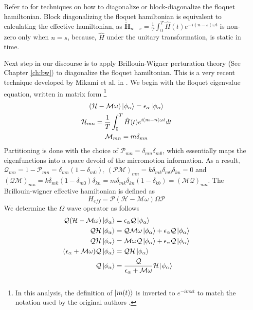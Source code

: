 Refer to \parencite{anisimovas2015high} for techniques on how to diagonalize or block-diagonalize the floquet hamiltonian. Block diagonalizing the floquet hamiltonian is
equivalent to calculating the effective hamiltonian, as $\tilde{\mathbf{H}}_{n-s} = \frac{1}{T}\int_{0}^{T}{\hat{H}(t) e^{-i(n-s)\omega t}}$ is non-zero only when
$n=s$, because, $\hat{H}$ under the unitary transformation, is static in time.

Next step in our discourse is to apply Brillouin-Wigner perturation theory (See Chapter \ref{ch:bw}) to diagonalize the floquet hamiltonian. This is a very recent technique developed by Mikami et al. in 
\parencite{mikami2016brillouin}. We begin with the floquet eigenvalue equation, written in matrix form \footnote{In this analysis, the definition of $\ket{m(t)}$ is 
inverted to $e^{-im\omega t}$ to match the notation used by the original authors \cite{mikami2016brillouin}.}
\begin{gather}
(\mathcal{H} - \mathcal{M}\omega)\ket{\phi_\alpha} = \epsilon_\alpha\ket{\phi_\alpha} \\
\mathcal{H}_{mn} = \frac{1}{T}\int_{0}^{T}{\hat{H}(t)e^{i(m-n)\omega t}dt} \\
\mathcal{M}_{mn} = m\delta_{mn}
\end{gather}
Partitioning is done with the choice of $\mathcal{P}_{mn} = \delta_{mn}\delta_{m0}$, which essentially maps the eigenfunctions into a space devoid of the micromotion information.
As a result, $\mathcal{Q}_{mn} = 1 - \mathcal{P}_{mn} = \delta_{mn}(1-\delta_{m0})$, $(\mathcal{P}\mathcal{M})_{mn} = k\delta_{mk}\delta_{m0}\delta_{kn}=0$ and
$(\mathcal{Q}\mathcal{M})_{mn} = k\delta_{mk}(1-\delta_{m0})\delta_{kn} = m\delta_{mk}\delta_{kn}(1-\delta_{k0}) = (\mathcal{M}\mathcal{Q})_{mn}$.
The Brillouin-wigner effective hamiltonian is defined as
\begin{equation}
 H_{eff} = \mathcal{P}(\mathcal{H} - \mathcal{M}\omega)\Omega\mathcal{P}
\end{equation} We determine the $\Omega$ wave operator as follows
\begin{align}
 \mathcal{Q}(\mathcal{H} - \mathcal{M}\omega)\ket{\phi_\alpha} &= \epsilon_\alpha\mathcal{Q}\ket{\phi_\alpha} \nonumber \\
 \mathcal{Q}\mathcal{H}\ket{\phi_\alpha} &= \mathcal{Q}\mathcal{M}\omega\ket{\phi_\alpha} + \epsilon_\alpha\mathcal{Q}\ket{\phi_\alpha} \nonumber \\
 \mathcal{Q}\mathcal{H}\ket{\phi_\alpha} &= \mathcal{M}\omega\mathcal{Q}\ket{\phi_\alpha} + \epsilon_\alpha\mathcal{Q}\ket{\phi_\alpha} \nonumber \\
 (\epsilon_\alpha + \mathcal{M}\omega)\mathcal{Q}\ket{\phi_\alpha} &= \mathcal{Q}\mathcal{H}\ket{\phi_\alpha} \nonumber \\
 \mathcal{Q}\ket{\phi_\alpha} &= \frac{\mathcal{Q}}{\epsilon_\alpha + \mathcal{M}\omega}\mathcal{H}\ket{\phi_\alpha} \\
\end{align}
